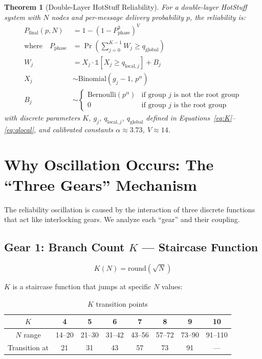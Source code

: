 \documentclass[12pt,a4paper]{article}
\newtheorem{theorem}{Theorem}
\begin{document}
\begin{theorem}[Double-Layer HotStuff Reliability]
\label{thm:main}
For a double-layer HotStuff system with $N$ nodes and per-message delivery probability $p$, the reliability is:
\begin{align}
  P_{\text{final}}(p, N) &= 1 - \left(1 - P_{\text{phase}}^3\right)^V \\[6pt]
  \text{where}\quad P_{\text{phase}} &= \Pr\left(\sum_{j=0}^{K-1} W_j \geq q_{\text{global}}\right) \\[6pt]
  W_j &= X_j \cdot \mathbb{1}[X_j \geq q_{\text{local},j}] + B_j \\[4pt]
  X_j &\sim \text{Binomial}(g_j - 1, \, p^{\alpha}) \\[4pt]
  B_j &\sim \begin{cases} \text{Bernoulli}(p^{\alpha}) & \text{if group } j \text{ is not the root group} \\ 0 & \text{if group } j \text{ is the root group} \end{cases}
\end{align}
with discrete parameters $K$, $g_j$, $q_{\text{local},j}$, $q_{\text{global}}$ defined in Equations~\eqref{eq:K}--\eqref{eq:qlocal}, and calibrated constants $\alpha \approx 3.73$, $V \approx 14$.
\end{theorem}

\section{Why Oscillation Occurs: The ``Three Gears'' Mechanism}
\label{sec:oscillation}

The reliability oscillation is caused by the interaction of three discrete functions that act like interlocking gears. We analyze each ``gear'' and their coupling.

\subsection{Gear 1: Branch Count $K$ --- Staircase Function}

\begin{equation}
  K(N) = \text{round}(\sqrt{N})
\end{equation}

$K$ is a staircase function that jumps at specific $N$ values:

\begin{table}[H]
\centering
\caption{$K$ transition points}
\begin{tabular}{cccccccc}
\toprule
$K$ & 4 & 5 & 6 & 7 & 8 & 9 & 10 \\
\midrule
$N$ range & 14--20 & 21--30 & 31--42 & 43--56 & 57--72 & 73--90 & 91--110 \\
Transition at & 21 & 31 & 43 & 57 & 73 & 91 & --- \\
\bottomrule
\end{tabular}
\end{table}
\end{document}
